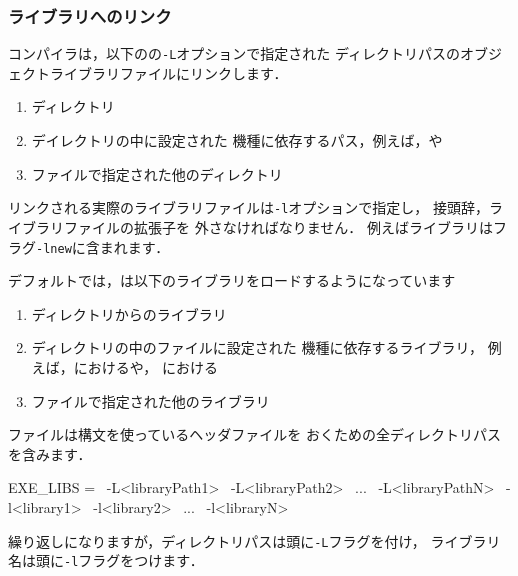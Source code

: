 \subsubsection{ライブラリへのリンク}
\label{sssec:3.2.2.2}
コンパイラは，以下のの\verb|-L|オプションで指定された
ディレクトリパスのオブジェクトライブラリファイルにリンクします．
\begin{enumerate}
 \item {}ディレクトリ
 \item {}デイレクトリの中に設定された
       機種に依存するパス，例えば，や
 \item {}ファイルで指定された他のディレクトリ
\end{enumerate}
リンクされる実際のライブラリファイルは\verb|-l|オプションで指定し，
接頭辞，ライブラリファイルの拡張子を
外さなければなりません．
例えばライブラリはフラグ\verb|-lnew|に含まれます．

デフォルトでは，は以下のライブラリをロードするようになっています
\begin{enumerate}
 \item {}ディレクトリからのライブラリ
 \item {}ディレクトリの中のファイルに設定された
       機種に依存するライブラリ，
       例えば，におけるや，
       における
 \item {}ファイルで指定された他のライブラリ
\end{enumerate}
ファイルは構文を使っているヘッダファイルを
おくための全ディレクトリパスを含みます．
\begin{OFverbatim}[file]
EXE_LIBS = \
    -L<libraryPath1> \
    -L<libraryPath2> \
    ...              \
    -L<libraryPathN> \
    -l<library1>     \
    -l<library2>     \
    ...              \
    -l<libraryN>
\end{OFverbatim}
繰り返しになりますが，ディレクトリパスは頭に\verb|-L|フラグを付け，
ライブラリ名は頭に\verb|-l|フラグをつけます．

